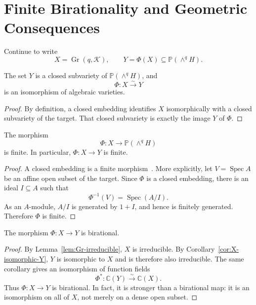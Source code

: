 \documentclass{siamonline250211}
\newcommand{\CC}{\mathbb C}
\newcommand{\PP}{\mathbb P}
\newcommand{\Gr}{\operatorname{Gr}}
\newcommand{\cK}{\mathcal K}
\begin{document}
\section{Finite Birationality and Geometric Consequences}

Continue to write
\[
  X=\Gr(q,\cK),
  \qquad
  Y=\Phi(X)\subseteq\PP(\wedge^qH).
\]

\begin{corollary}
\label{cor:X-isomorphic-Y}
The set $Y$ is a closed subvariety of $\PP(\wedge^qH)$, and
\[
  \Phi:X\xrightarrow{\sim}Y
\]
is an isomorphism of algebraic varieties.
\end{corollary}

\begin{proof}
By definition, a closed embedding identifies $X$ isomorphically with a closed
subvariety of the target. That closed subvariety is exactly the image $Y$ of
$\Phi$.
\end{proof}

\begin{corollary}[Finiteness]\label{cor:finite}
The morphism
\[
  \Phi:X\longrightarrow\PP(\wedge^qH)
\]
is finite. In particular, $\Phi:X\to Y$ is finite.
\end{corollary}

\begin{proof}
A closed embedding is a finite morphism~\cite[Tag~035C]{Stacks}. More explicitly,
let $V=\operatorname{Spec}A$ be an affine open subset of the target. Since
$\Phi$ is a closed embedding, there is an ideal $I\subseteq A$ such that
\[
  \Phi^{-1}(V)=\operatorname{Spec}(A/I).
\]
As an $A$-module, $A/I$ is generated by $1+I$, and hence is finitely generated.
Therefore $\Phi$ is finite.
\end{proof}

\begin{corollary}[Birationality]\label{cor:birational}
The morphism $\Phi:X\to Y$ is birational.
\end{corollary}

\begin{proof}
By Lemma~\ref{lem:Gr-irreducible}, $X$ is irreducible. By
Corollary~\ref{cor:X-isomorphic-Y}, $Y$ is isomorphic to $X$ and is therefore
also irreducible. The same corollary gives an isomorphism of function fields
\[
  \Phi^*:\CC(Y)\xrightarrow{\sim}\CC(X).
\]
Thus $\Phi:X\to Y$ is birational. In fact, it is stronger than a birational map:
it is an isomorphism on all of $X$, not merely on a dense open subset.
\end{proof}
\end{document}

